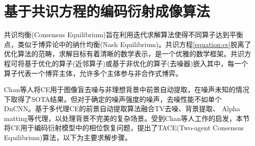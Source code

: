 \section{基于共识方程的编码衍射成像算法}
共识均衡(Consensus Equilibrium)旨在利用迭代求解算法使得不同算子达到平衡点，类似于博弈论中的纳什均衡(Nash Equilibrium)。共识方程\eqref{equation:ce}脱离了优化算法的范畴，求解目标有着清晰的数学表示，是一个优雅的数学框架。共识方程可将基于优化的算子(近邻算子)或基于非优化的算子(去噪器)嵌入其中，每一个算子代表一个博弈主体，允许多个主体参与非合作式博弈。

Chan等人将CE用于图像盲去噪与非理想背景中前景自动提取\cite{Gregery,Xiran}，在噪声未知的情况下取得了SOTA结果\supercite{Gregery,Joon,Xiran}。但对于确定的噪声强度的噪声，去噪性能不如单个DnCNN。基于多代理CE的前景自动提取算法融合TV去噪、背景提取、 Alpha matting等代理，以处理背景不完美的复杂场景。受到Chan等人工作的启发，本节将CE用于编码衍射模型中的相位恢复问题，提出了TACE(Two-agent Consensus Equilibrium)算法，以下为主要求解步骤。

